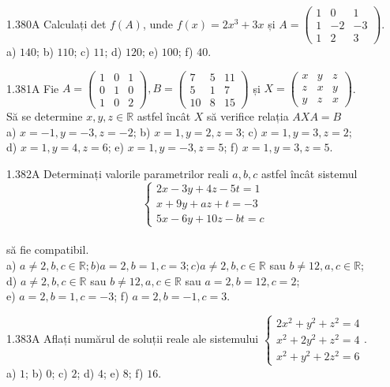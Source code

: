 \documentclass[11pt]{article}
\begin{document}
1.380A Calculați det $f(A)$, unde $f(x)=2 x^{3}+3 x$ și $A=\left(\begin{array}{ccc}1 & 0 & 1 \\ 1 & -2 & -3 \\ 1 & 2 & 3\end{array}\right)$.\\ a) $140$; b) $110$; c) $11$; d) $120$; e) $100$; f) $40$.

1.381A Fie $A=\left(\begin{array}{lll}1 & 0 & 1 \\ 0 & 1 & 0 \\ 1 & 0 & 2\end{array}\right), B=\left(\begin{array}{ccc}7 & 5 & 11 \\ 5 & 1 & 7 \\ 10 & 8 & 15\end{array}\right)$ și $X=\left(\begin{array}{lll}x & y & z \\ z & x & y \\ y & z & x\end{array}\right)$.\\ Să se determine $x, y, z \in \mathbb{R}$ astfel încât $X$ să verifice relația $A X A=B$\\ a) $x=-1, y=-3, z=-2$; b) $x=1, y=2, z=3$; c) $x=1, y=3, z=2$;\\ d) $x=1, y=4, z=6$; e) $x=1, y=-3, z=5$; f) $x=1, y=3, z=5$.

1.382A Determinați valorile parametrilor reali $a, b, c$ astfel încât sistemul $$\left\{\begin{array}{l}2 x-3 y+4 z-5 t=1 \\x+9 y+a z+t=-3 \\5 x-6 y+10 z-b t=c\end{array}\right.$$\\ să fie compatibil.\\ a) $a \neq 2, b, c \in \mathbb{R} ; b) a=2, b=1, c=3 ; c) a \neq 2, b, c \in \mathbb{R}$ sau $b \neq 12, a, c \in \mathbb{R}$;\\ d) $a \neq 2, b, c \in \mathbb{R}$ sau $b \neq 12, a, c \in \mathbb{R}$ sau $a=2, b=12, c=2$;\\ e) $a=2, b=1, c=-3$; f) $a=2, b=-1, c=3$.

1.383A Aflați numărul de soluții reale ale sistemului $\left\{\begin{array}{l}2 x^{2}+y^{2}+z^{2}=4 \\ x^{2}+2 y^{2}+z^{2}=4 \\ x^{2}+y^{2}+2 z^{2}=6\end{array}\right.$.\\ a) $1$; b) $0$; c) $2$; d) $4$; e) $8$; f) $16$.
\end{document}
